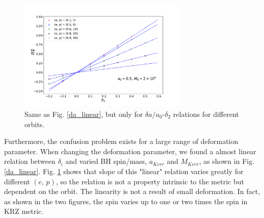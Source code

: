 \documentclass{article}
\begin{document}
\begin{figure}[!ht]
	\centering
	\includegraphics[width=8cm]{d2_deltaspin_ep.pdf}
	
	\caption{Same as Fig. \ref{da_linear}, but only for $\delta a/a_0$-$\delta_2$ relations for different orbits.}
	\label{ep_slope}
\end{figure}

Furthermore, the confusion problem exists for a large range of deformation parameter. When changing the deformation parameter, we found a almost linear relation between $\delta_i$ and varied BH spin/mass, $a_{Kerr}$ and $M_{Kerr}$, as shown in Fig. \ref{da_linear}. Fig. \ref{ep_slope} shows that slope of this "linear" relation varies greatly for different $(e,\,p)$, so the relation is not a property intrinsic to the metric but dependent on the orbit. The linearity is not a result of small deformation. In fact, as shown in the two figures, the spin varies up to one or two times the spin in KRZ metric. 
\end{document}
